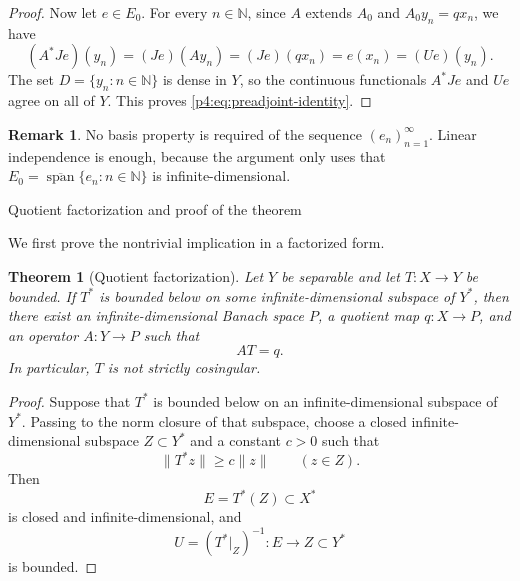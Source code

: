 \documentclass[11pt,reqno]{amsart}
\makeatletter
\theoremstyle{plain}
\newtheorem{theorem}{Theorem}[section]
\theoremstyle{definition}
\newtheorem{remark}[remark]{Remark}
\newcommand{\N}{\mathbb N}
\newcounter{problempaper}
\newenvironment{problempaperbody}{%
  \setcounter{subsection}{0}%
  \setcounter{subsubsection}{0}%
  \setcounter{paragraph}{0}%
  \renewcommand{\thesubsection}{\arabic{subsection}}%
  \renewcommand{\thesubsubsection}{\thesubsection.\arabic{subsubsection}}%
  \renewcommand{\theparagraph}{\thesubsubsection.\arabic{paragraph}}%
  \let\problem@outersection\section
  \let\problem@outersubsection\subsection
  \let\problem@outersubsubsection\subsubsection
  \let\problem@outerparagraph\paragraph
  \let\section\problem@papersection
  \let\subsection\problem@papersubsection
  \let\subsubsection\problem@papersubsubsection
}{%
  \let\section\problem@outersection
  \let\subsection\problem@outersubsection
  \let\subsubsection\problem@outersubsubsection
  \let\paragraph\problem@outerparagraph
}
\newcommand{\problem@target}[2]{%
  \hypertarget{problem-\theproblempaper-#1-#2}{}%
}
\newcommand{\problem@paperheading}[3]{%
  \par\bigskip
  \problem@target{#1}{#2}%
  \noindent{\large\bfseries #2.\quad #3\par}%
  \nobreak\smallskip
}
\newcommand{\problem@papersubheading}[3]{%
  \par\medskip
  \problem@target{#1}{#2}%
  \noindent{\normalsize\bfseries #2.\quad #3\par}%
  \nobreak\smallskip
}
\newcommand{\problem@papersubsubheading}[3]{%
  \par\smallskip
  \problem@target{#1}{#2}%
  \noindent{\normalsize\itshape #2.\quad #3.\ }%
}
\def\problem@papersection{%
  \@ifstar{\problem@papersectionstar}{\problem@papersectionnostar}%
}
\def\problem@papersectionstar#1{%
  \par\bigskip\noindent{\large\bfseries #1\par}\nobreak\smallskip
}
\def\problem@papersectionnostar#1{%
  \refstepcounter{subsection}%
  \setcounter{subsubsection}{0}%
  \setcounter{paragraph}{0}%
  \problem@paperheading{section}{\thesubsection}{#1}%
  \problem@writecontentsline{section}{\thesubsection}{#1}%
}
\def\problem@papersubsection{%
  \@ifstar{\problem@papersubsectionstar}{\problem@papersubsectionnostar}%
}
\def\problem@papersubsectionstar#1{%
  \par\medskip\noindent{\normalsize\bfseries #1\par}\nobreak\smallskip
}
\def\problem@papersubsectionnostar#1{%
  \refstepcounter{subsubsection}%
  \setcounter{paragraph}{0}%
  \problem@papersubheading{subsection}{\thesubsubsection}{#1}%
  \problem@writecontentsline{subsection}{\thesubsubsection}{#1}%
}
\def\problem@papersubsubsection{%
  \@ifstar{\problem@papersubsubsectionstar}{\problem@papersubsubsectionnostar}%
}
\def\problem@papersubsubsectionstar#1{%
  \par\smallskip\noindent{\normalsize\itshape #1.\ }%
}
\def\problem@papersubsubsectionnostar#1{%
  \refstepcounter{paragraph}%
  \problem@papersubsubheading{subsubsection}{\theparagraph}{#1}%
  \problem@writecontentsline{subsubsection}{\theparagraph}{#1}%
}
\newcommand{\problem@writecontentsline}[3]{%
  \begingroup
  \protected@write\@auxout{}{%
    \string\problemcontentsentry{\theproblempaper}{#1}{#2}{#3}{\thepage}%
  }%
  \endgroup
}
\newcommand{\problemcontentsentry}[5]{%
  \@ifundefined{problemcontents@#1}{%
    \expandafter\gdef\csname problemcontents@#1\endcsname{}%
  }{}%
  \expandafter\g@addto@macro\csname problemcontents@#1\endcsname{%
    \problemcontentsline{#1}{#2}{#3}{#4}{#5}%
  }%
}
\newcommand{\problemcontentslink}[4]{%
  \hyperlink{problem-#1-#2-#3}{#4}%
}
\newcommand{\problemcontentsline}[5]{%
  \ifstrequal{#2}{section}{%
    \par\noindent
    \problemcontentslink{#1}{#2}{#3}{\makebox[2.5em][l]{#3}#4}%
    \nobreak\dotfill
    \problemcontentslink{#1}{#2}{#3}{#5}\par
  }{%
    \ifstrequal{#2}{subsection}{%
      \par\noindent\hspace*{1.5em}%
      \problemcontentslink{#1}{#2}{#3}{\makebox[3.5em][l]{#3}#4}%
      \nobreak\dotfill
      \problemcontentslink{#1}{#2}{#3}{#5}\par
    }{%
      \par\noindent\hspace*{3em}%
      \problemcontentslink{#1}{#2}{#3}{\makebox[4.5em][l]{#3}#4}%
      \nobreak\dotfill
      \problemcontentslink{#1}{#2}{#3}{#5}\par
    }%
  }%
}
\makeatother
\begin{document}
\begin{problempaperbody}
\begin{proof}
Now let $e\in E_0$. For every $n\in\N$, since $A$ extends $A_0$ and $A_0y_n=qx_n$, we have
\begin{equation*}
        (A^*Je)(y_n)=(Je)(Ay_n)=(Je)(qx_n)=e(x_n)=(Ue)(y_n).
\end{equation*}
The set $D= \{y_n:n\in\N\}$ is dense in $Y$, so the continuous functionals $A^*Je$ and $Ue$ agree on all of $Y$. This proves \eqref{p4:eq:preadjoint-identity}.
\end{proof}

\begin{remark}
\label{p4:rem:no-basis-needed}
No basis property is required of the sequence $(e_n)_{n=1}^{\infty}$. Linear independence is enough, because the argument only uses that $E_0=\overline{\operatorname{span}}\{e_n:n\in\N\}$ is infinite-dimensional.
\end{remark}

\section{Quotient factorization and proof of the theorem}
\label{p4:sec:factorization}

We first prove the nontrivial implication in a factorized form.

\begin{theorem}[Quotient factorization]
\label{p4:thm:quotient-factorization}
Let $Y$ be separable and let $T\colon X\to Y$ be bounded. If $T^*$ is bounded below on some infinite-dimensional subspace of $Y^*$, then there exist an infinite-dimensional Banach space $P$, a quotient map $q\colon X\to P$, and an operator $A\colon Y\to P$ such that
\begin{equation*}
        AT=q.
\end{equation*}
In particular, $T$ is not strictly cosingular.
\end{theorem}

\begin{proof}
Suppose that $T^*$ is bounded below on an infinite-dimensional subspace of $Y^*$. Passing to the norm closure of that subspace, choose a closed infinite-dimensional subspace $Z\subset Y^*$ and a constant $c>0$ such that
\begin{equation*}
        \|T^*z\|\geq c\|z\| \qquad(z\in Z).
\end{equation*}
Then
\begin{equation*}
        E=T^*(Z)\subset X^*
\end{equation*}
is closed and infinite-dimensional, and
\begin{equation*}
        U=(T^*|_Z)^{-1}:E\to Z\subset Y^*
\end{equation*}
is bounded.


\end{proof}
\end{problempaperbody}
\end{document}
